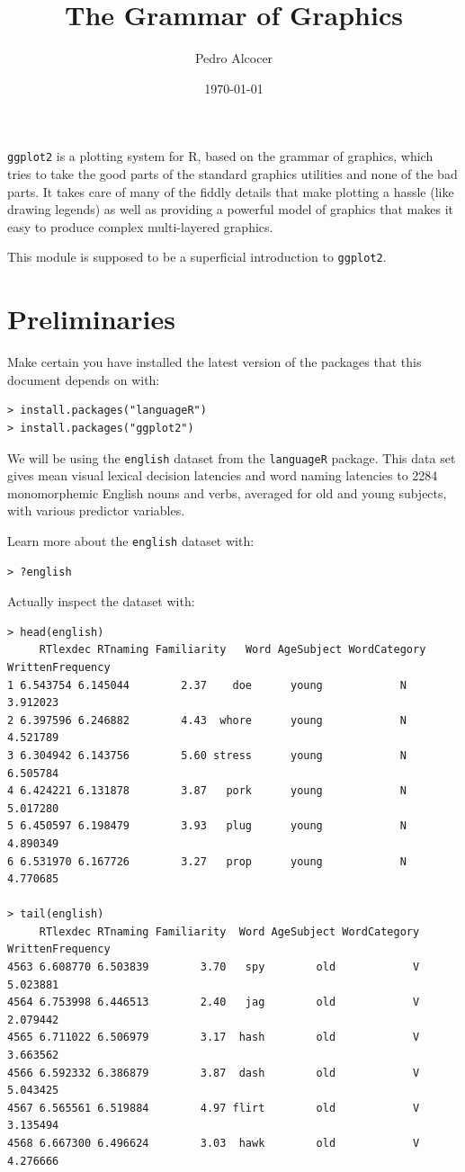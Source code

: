 \documentclass[oneside,10pt]{article}
\title{The Grammar of Graphics}
\author{Pedro Alcocer}
\date{\today}
\begin{document}
\maketitle

\noindent\texttt{ggplot2} is a plotting system for R, based on the grammar of graphics, which tries to take the good parts of the standard graphics utilities and none of the bad parts. It takes care of many of the fiddly details that make plotting a hassle (like drawing legends) as well as providing a powerful model of graphics that makes it easy to produce complex multi-layered graphics.

This module is supposed to be a superficial introduction to \texttt{ggplot2}.

\section{Preliminaries}

Make certain you have installed the latest version of the packages that this document depends on with:

\begin{verbatim}
> install.packages("languageR")
> install.packages("ggplot2")
\end{verbatim}

We will be using the \texttt{english} dataset from the \texttt{languageR} package. This data set gives mean visual lexical decision latencies and word naming latencies to 2284 monomorphemic English nouns and verbs, averaged for old and young subjects, with various predictor variables.

Learn more about the \texttt{english} dataset with:

\begin{verbatim}
> ?english
\end{verbatim}

Actually inspect the dataset with:

\begin{verbatim}
> head(english)
     RTlexdec RTnaming Familiarity   Word AgeSubject WordCategory WrittenFrequency
1 6.543754 6.145044        2.37    doe      young            N         3.912023
2 6.397596 6.246882        4.43  whore      young            N         4.521789
3 6.304942 6.143756        5.60 stress      young            N         6.505784
4 6.424221 6.131878        3.87   pork      young            N         5.017280
5 6.450597 6.198479        3.93   plug      young            N         4.890349
6 6.531970 6.167726        3.27   prop      young            N         4.770685

> tail(english)
     RTlexdec RTnaming Familiarity  Word AgeSubject WordCategory WrittenFrequency
4563 6.608770 6.503839        3.70   spy        old            V         5.023881
4564 6.753998 6.446513        2.40   jag        old            V         2.079442
4565 6.711022 6.506979        3.17  hash        old            V         3.663562
4566 6.592332 6.386879        3.87  dash        old            V         5.043425
4567 6.565561 6.519884        4.97 flirt        old            V         3.135494
4568 6.667300 6.496624        3.03  hawk        old            V         4.276666
\end{verbatim}
\end{document}
